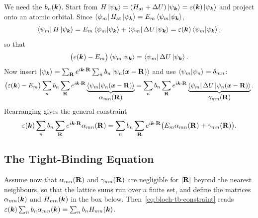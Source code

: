 We need the $b_n(\bm{k})$. Start from $H\ket{\psi_{\bm{k}}} = (H_{\text{at}} + \Delta U)\ket{\psi_{\bm{k}}} = \varepsilon(\bm{k})\ket{\psi_{\bm{k}}}$ and project onto an atomic orbital. Since $\bra{\psi_m} H_{\text{at}} \ket{\psi_{\bm{k}}} = E_m \braket{\psi_m}{\psi_{\bm{k}}}$,
\begin{equation}
    \bra{\psi_m} H \ket{\psi_{\bm{k}}} = E_m \braket{\psi_m}{\psi_{\bm{k}}} + \bra{\psi_m}\Delta U\ket{\psi_{\bm{k}}} = \varepsilon(\bm{k}) \braket{\psi_m}{\psi_{\bm{k}}},
\end{equation}
so that
\begin{equation}
    \bigl(\varepsilon(\bm{k}) - E_m\bigr) \braket{\psi_m}{\psi_{\bm{k}}} = \bra{\psi_m} \Delta U \ket{\psi_{\bm{k}}}.
\end{equation}
Now insert $\ket{\psi_{\lvect{k}}} = \sum_{\cvect{R}} e^{i\lvect{k}\cdot\cvect{R}} \sum_n b_n \ket{\psi_n(\lvect{x}-\cvect{R})}$ and use $\braket{\psi_m}{\psi_n} = \delta_{mn}$:
\begin{equation}
    \bigl(\varepsilon(\lvect{k}) - E_m\bigr) \sum_n b_n \sum_{\cvect{R}} e^{i\lvect{k}\cdot\cvect{R}}
    \underbrace{\braket{\psi_m}{\psi_n(\lvect{x}-\cvect{R})}}_{\displaystyle \alpha_{mn}(\cvect{R})}
    = \sum_n b_n \sum_{\cvect{R}} e^{i\lvect{k}\cdot\cvect{R}}
    \underbrace{\bra{\psi_m} \Delta U \ket{\psi_n(\lvect{x}-\cvect{R})}}_{\displaystyle \gamma_{mn}(\cvect{R})}.
\end{equation}
Rearranging gives the general constraint
\begin{equation}
    \varepsilon(\lvect{k}) \sum_n b_n \sum_{\cvect{R}} e^{i\lvect{k}\cdot\cvect{R}} \alpha_{mn}(\cvect{R})
    = \sum_n b_n \sum_{\cvect{R}} e^{i\lvect{k}\cdot\cvect{R}} \bigl( E_m \alpha_{mn}(\cvect{R}) + \gamma_{mn}(\cvect{R}) \bigr).
    \label{eq:bloch-tb-constraint}
\end{equation}

\subsection{The Tight-Binding Equation}

Assume now that $\alpha_{mn}(\cvect{R})$ and $\gamma_{mn}(\cvect{R})$ are negligible for $|\cvect{R}|$ beyond the nearest neighbours, so that the lattice sums run over a finite set, and define the matrices $\alpha_{mn}(\bm{k})$ and $H_{mn}(\bm{k})$ in the box below. Then~\eqref{eq:bloch-tb-constraint} reads $\varepsilon(\bm{k}) \sum_n b_n \alpha_{mn}(\bm{k}) = \sum_n b_n H_{mn}(\bm{k})$.


